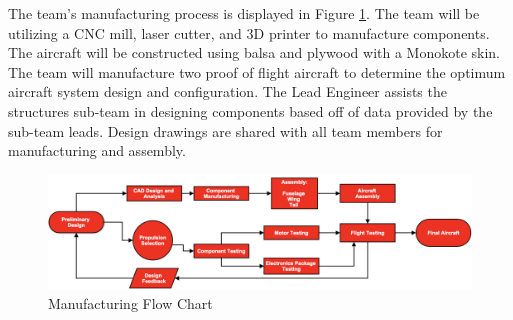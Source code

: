 
%
The team's manufacturing process is displayed in Figure \ref{fig:miles}. The team will be utilizing a CNC mill, laser cutter, and 3D printer to manufacture components. The aircraft will be constructed using balsa and plywood with a Monokote skin. The team will manufacture two proof of flight aircraft to determine the optimum aircraft system design and configuration. The Lead Engineer assists the structures sub-team in designing components based off of data provided by the sub-team leads. Design drawings are shared with all team members for manufacturing and assembly.

\begin{figure}[H]
    \centering
    \includegraphics[width=\linewidth]{Images/mf.png}
    \vspace{-15pt}
    \caption{Manufacturing Flow Chart}
    \label{fig:miles}
    \vspace{-.5em}
\end{figure}
 